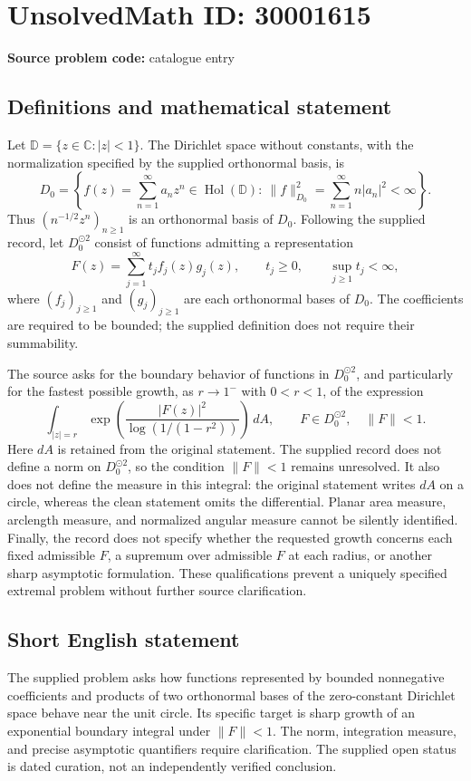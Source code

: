 \documentclass[11pt]{article}
\newcommand{\C}{\mathbb{C}}
\begin{document}
\section*{UnsolvedMath ID: 30001615}
\textbf{Source problem code:} catalogue entry
\subsection{Definitions and mathematical statement}
Let \(\mathbb D=\{z\in\C:|z|<1\}\). The Dirichlet space without constants, with the normalization specified by the supplied orthonormal basis, is
\[
D_0=\left\{f(z)=\sum_{n=1}^{\infty}a_nz^n\in\operatorname{Hol}(\mathbb D):\ \|f\|_{D_0}^2=\sum_{n=1}^{\infty}n|a_n|^2<\infty\right\}.
\]
Thus \((n^{-1/2}z^n)_{n\geq1}\) is an orthonormal basis of \(D_0\). Following the supplied record, let \(D_0^{\odot2}\) consist of functions admitting a representation
\[
F(z)=\sum_{j=1}^{\infty}t_jf_j(z)g_j(z),\qquad t_j\geq0,\qquad \sup_{j\geq1}t_j<\infty,
\]
where \((f_j)_{j\geq1}\) and \((g_j)_{j\geq1}\) are each orthonormal bases of \(D_0\). The coefficients are required to be bounded; the supplied definition does not require their summability.

The source asks for the boundary behavior of functions in \(D_0^{\odot2}\), and particularly for the fastest possible growth, as \(r\to1^-\) with \(0<r<1\), of the expression
\[
\int_{|z|=r}\exp\!\left(\frac{|F(z)|^2}{\log(1/(1-r^2))}\right)\,dA,
\qquad F\in D_0^{\odot2},\quad \|F\|<1.
\]
Here \(dA\) is retained from the original statement. The supplied record does not define a norm on \(D_0^{\odot2}\), so the condition \(\|F\|<1\) remains unresolved. It also does not define the measure in this integral: the original statement writes \(dA\) on a circle, whereas the clean statement omits the differential. Planar area measure, arclength measure, and normalized angular measure cannot be silently identified. Finally, the record does not specify whether the requested growth concerns each fixed admissible \(F\), a supremum over admissible \(F\) at each radius, or another sharp asymptotic formulation. These qualifications prevent a uniquely specified extremal problem without further source clarification.
\subsection{Short English statement}
The supplied problem asks how functions represented by bounded nonnegative coefficients and products of two orthonormal bases of the zero\mbox{-}constant Dirichlet space behave near the unit circle. Its specific target is sharp growth of an exponential boundary integral under \(\|F\|<1\). The norm, integration measure, and precise asymptotic quantifiers require clarification. The supplied open status is dated curation, not an independently verified conclusion.
\end{document}
